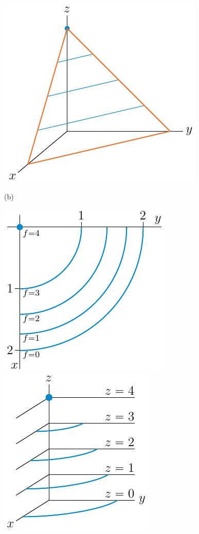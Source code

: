 \begin{solution}
\begin{center}
  \includegraphics{fig/planeGraphB.pdf}
\end{center}


(b)
\begin{center}
  \includegraphics{fig/paraboloidLevelB.pdf}
\qquad
  \includegraphics{fig/paraboloidGraphA.pdf}
\end{center}


\end{solution}
